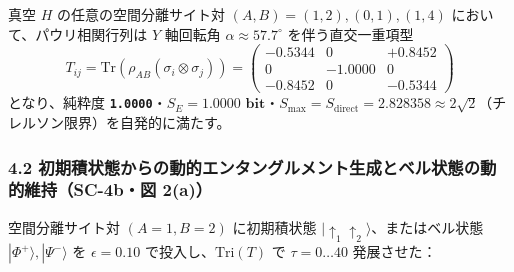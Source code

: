 \documentclass[
  a4paper,
]{ltjsarticle}
\begin{document}
真空 \(H\) の任意の空間分離サイト対 \((A,B) = (1,2), (0,1), (1,4)\)
において、パウリ相関行列は \(Y\) 軸回転角 \(\alpha \approx 57.7^\circ\)
を伴う直交一重項型
\[T_{ij} = \mathrm{Tr}(\rho_{AB}(\sigma_i\otimes\sigma_j)) = \begin{pmatrix} -0.5344 & 0 & +0.8452 \\ 0 & -1.0000 & 0 \\ -0.8452 & 0 & -0.5344 \end{pmatrix}\]
となり、純粋度
\textbf{\texttt{1.0000}}・\(S_E = \mathbf{1.0000\text{ bit}}\)・\textbf{\(S_{\max} = S_{\mathrm{direct}} = \mathbf{2.828358} \approx 2\sqrt{2}\)}（チレルソン限界）を自発的に満たす。

\subsubsection{4.2
初期積状態からの動的エンタングルメント生成とベル状態の動的維持（SC-4b・図
2(a)）}\label{ux521dux671fux7a4dux72b6ux614bux304bux3089ux306eux52d5ux7684ux30a8ux30f3ux30bfux30f3ux30b0ux30ebux30e1ux30f3ux30c8ux751fux6210ux3068ux30d9ux30ebux72b6ux614bux306eux52d5ux7684ux7dadux6301sc-4bux56f3-2a}

空間分離サイト対 \((A=1, B=2)\) に初期積状態
\(|\uparrow_1\uparrow_2\rangle\)、またはベル状態
\(|\Phi^+\rangle, |\Psi^-\rangle\) を \(\epsilon = 0.10\)
で投入し、\(\mathrm{Tri}(T)\) で \(\tau = 0 \dots 40\) 発展させた：
\end{document}
